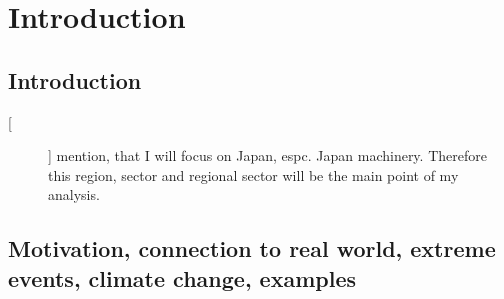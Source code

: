 
\chapter{Introduction}



\section{Introduction}

\begin{description}
 \item[[ ]] mention, that I will focus on Japan, espc. Japan machinery. Therefore this region, sector and regional sector will be the main point of 
my analysis.
\end{description}



\section{Motivation, connection to real world, extreme events, climate change, examples}


